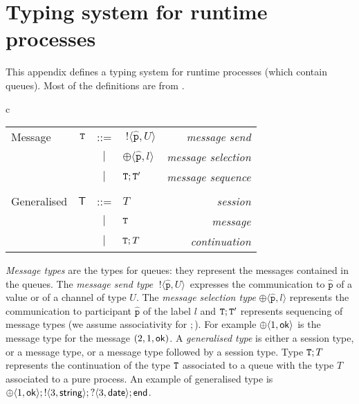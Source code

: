 \documentclass{LMCS}
\newcommand{\ptilde}[1]{{\ensuremath{#1}}}
\newcommand{\kf}[1]{\textup{\textsf{#1}}\xspace}
\newcommand{\participant}[1]{\ensuremath{\mathtt{#1}}}
\newcommand{\p}{\ensuremath{\participant{p}}}
\newcommand{\anglep}[2]{\ensuremath{\langle #1, #2\rangle}}
\newcommand{\at}[1]{\ensuremath{\ptilde{#1}}}
\newcommand{\sep}{\ensuremath{~\mathbf{|}~ }}
\newcommand{\T}{\ensuremath{T}}
\newcommand{\TQ}{\ensuremath{{\tt{T}}}}
\newcommand{\TG}{\ensuremath{{\mathsf{T}}}}
\newcommand{\UT}{\ensuremath{U}}
\newcommand{\oT}[2]{\ensuremath{\;!\langle #2,#1\rangle}}
\newcommand{\End}{\kf{end}}
\newcommand{\seltypes}{\ensuremath{\oplus\langle\pv,l\rangle}}
\newcommand{\pv}{\ensuremath{\at{\hat{\p}}}}
\begin{document}
 




\section{Typing system for runtime processes}
\label{app:runtime}
This appendix defines a typing system for runtime processes
(which contain queues).   
Most of the definitions are from \cite{BettiniCDLDY08LONG}. 


\begin{center}
\begin{tabular}{c}
\begin{tabular}{lrclr}
  Message & $\TQ$ & ::= &
         \oT\UT{\pv} & \emph{message send}\\
         &     & \sep  & \seltypes &\emph{message selection}\\
         &     & \sep  & $\TQ;\TQ'$ &\emph{message sequence}\\
\\
  Generalised \quad\quad\quad & $\TG$ & ::= &
         \T
  & \emph{session}\\
         &     & \sep & \TQ &\ \emph{message}\\
         &     & \sep & $\TQ;\T$ &\ \emph{continuation}\\[0.5mm]
\end{tabular}
\end{tabular}
\end{center}

\noindent
{\em Message types} are the types for queues: they
represent the messages contained in the queues. The {\em message
send type} \oT\UT{\pv}\ expresses the communication to $\pv$ 
of a value or of a channel of type \UT. The {\em
message selection type} \seltypes{} represents the communication to
participant $\pv$ of the label $l$ and $\TQ;\TQ'$
represents sequencing of message types (we assume associativity for $;$). For
example $\oplus\anglep{1}{\kf{ok}}$ is the message type for the
message $(2,1,\kf{ok})$. A {\em generalised type} is either
a session type, or a message type, or a message type followed by a
session type. Type $\TQ;\T$ represents the continuation of the type $\TQ$
associated to a queue with the type $\T$ associated to a pure process. An
example of generalised type is
$\oplus\anglep{1}{\kf{ok}};!\langle
3,\kf{string}\rangle; ?\langle 3,\kf{date}\rangle; \End$.
\end{document}
